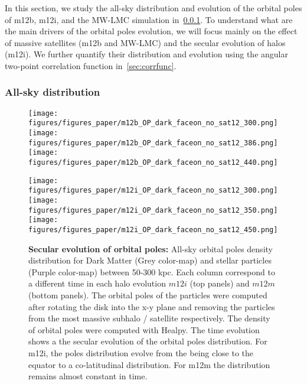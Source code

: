 \documentclass{aastex63}
\begin{document}
In this section, we study the all-sky distribution and evolution of the orbital poles of m12b, m12i, and the MW-LMC simulation in~\ref{sec:all-sky}. To understand what are the main drivers of the orbital poles evolution, we will focus mainly on the effect of massive satellites (m12b and MW-LMC) and the secular evolution of halos (m12i). We further quantify their distribution and evolution using the angular two-point correlation function in~\ref{sec:corrfunc}. 

\subsubsection{All-sky distribution}\label{sec:all-sky}


\begin{figure*}[h]
    \centering
    \texttt{[image: figures/figures\_paper/m12b\_OP\_dark\_faceon\_no\_sat12\_300.png]}
    \texttt{[image: figures/figures\_paper/m12b\_OP\_dark\_faceon\_no\_sat12\_386.png]}
    \texttt{[image: figures/figures\_paper/m12b\_OP\_dark\_faceon\_no\_sat12\_440.png]}

    
    \texttt{[image: figures/figures\_paper/m12i\_OP\_dark\_faceon\_no\_sat12\_300.png]}
    \texttt{[image: figures/figures\_paper/m12i\_OP\_dark\_faceon\_no\_sat12\_350.png]}
    \texttt{[image: figures/figures\_paper/m12i\_OP\_dark\_faceon\_no\_sat12\_450.png]}
    

    \caption{\textbf{Secular evolution of orbital poles:} All-sky orbital poles density distribution for Dark Matter (Grey color-map) and stellar particles (Purple color-map) between 50-300 kpc. Each column correspond to a different time in each halo evolution  $m12i$ (top panels) and $m12m$ (bottom panels). The orbital poles of the particles were computed after rotating the disk into the x-y plane and removing the particles from the most massive subhalo / satellite respectively. The density of orbital poles were computed with Healpy. The time evolution shows a the secular evolution of the orbital poles distribution. For m12i, the poles distribution evolve from the being close to the equator to a co-latitudinal distribution. For m12m the distribution remains almost constant in time.}
    \label{fig:all-sky}
\end{figure*}
\end{document}
